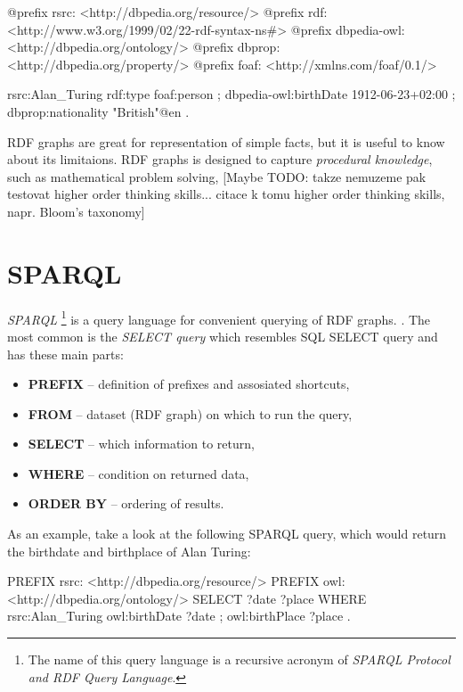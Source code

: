 \documentclass[a4paper, 12pt, twoside]{fithesis2}		%
\renewcommand{\_}{\leavevmode \kern0.07em\vbox{\hrule width0.4em}}
\newcommand{\squarebullet}{\textcolor{black}{\raisebox{0.15em}{\rule{4pt}{4pt}}}}
\newenvironment{myItemize}{
  \begin{itemize}[leftmargin=2em,rightmargin=1em,itemsep=\parskip ,parsep=0em,topsep=0em,partopsep=0em]
  \renewcommand{\labelitemi}{\squarebullet}
  \renewcommand{\labelitemii}{$\diamond$}
}{
  \end{itemize}
}
\begin{document}
\begin{code}
@prefix rsrc: <http://dbpedia.org/resource/>
@prefix rdf: <http://www.w3.org/1999/02/22-rdf-syntax-ns#>
@prefix dbpedia-owl: <http://dbpedia.org/ontology/>
@prefix dbprop: <http://dbpedia.org/property/>
@prefix foaf: <http://xmlns.com/foaf/0.1/>

rsrc:Alan_Turing
  rdf:type foaf:person ;
  dbpedia-owl:birthDate 1912-06-23+02:00 ;
  dbprop:nationality "British"@en .
\end{code}

RDF graphs are great for representation of simple facts, but it is useful to know about its limitaions. RDF graphs is designed to capture \textit{procedural knowledge}, such as mathematical problem solving,
[Maybe TODO: takze nemuzeme pak testovat higher order thinking skills... citace k tomu higher order thinking skills, napr. Bloom's taxonomy]


\section{SPARQL}
\label{sec:sparql}

\textit{SPARQL}%
\footnote{The name of this query language is a recursive acronym of \textit{SPARQL Protocol and RDF Query Language}.}
is a query language for convenient querying of RDF graphs. \parencite[][84]{semantic-web}.
The most common is the \textit{SELECT query} which resembles SQL SELECT query and has these main parts:
\begin{myItemize}
  \item \textbf{PREFIX} -- definition of prefixes and assosiated shortcuts,
  \item \textbf{FROM} -- dataset (RDF graph) on which to run the query,
  \item \textbf{SELECT} -- which information to return,
  \item \textbf{WHERE} -- condition on returned data,
  \item \textbf{ORDER BY} -- ordering of results.
\end{myItemize}
As an example, take a look at the following SPARQL query, which would return the birthdate and birthplace of Alan Turing:
\begin{code}
PREFIX rsrc: <http://dbpedia.org/resource/>
PREFIX owl: <http://dbpedia.org/ontology/>
SELECT ?date ?place
WHERE {
  rsrc:Alan_Turing owl:birthDate ?date ;
                   owl:birthPlace ?place .
}
\end{code}
\end{document}
